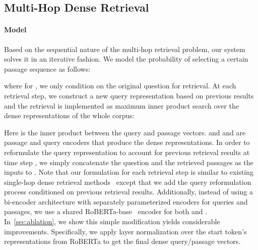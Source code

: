 \documentclass{article} \usepackage{iclr2021_conference,times}
\begin{document}
\subsection{Multi-Hop Dense Retrieval} 
\label{sec:model}

\paragraph{Model} Based on the sequential nature of the multi-hop retrieval problem, our system solves it in an iterative fashion. We model the probability of selecting a certain passage sequence as follows:

where for , we only condition on the original question for retrieval. At each retrieval step, we construct a new query representation based on previous results and the retrieval is implemented as maximum inner product search over the dense representations of the whole corpus:

Here  is the inner product between the query and passage vectors.  and and  are passage and query encoders that produce the dense representations. In order to reformulate the query representation to account for previous retrieval results at time step , 
we simply concatenate the question and the retrieved passages as the inputs to . Note that our formulation for each retrieval step is similar to existing single-hop dense retrieval methods~\citep{ORQA,REALM,DPR} except that we add the query reformulation process conditioned on previous retrieval results. Additionally, instead of using a bi-encoder architecture with separately parameterized encoders for queries and passages, we use a shared  RoBERTa-base~\citep{RoBERTa} encoder for both  and . In~\cref{sec:ablation}, we show this simple modification yields considerable improvements.
Specifically, we apply layer normalization over the start token's representations from RoBERTa to get the final dense query/passage vectors. 
\end{document}
